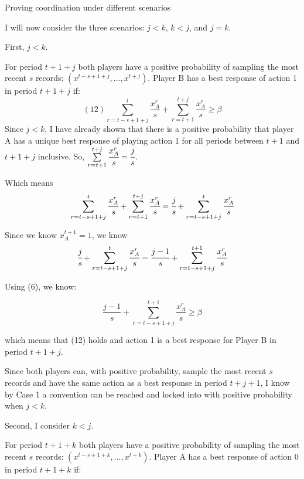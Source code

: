 \documentclass{article}
\begin{document}
\vskip12pt

\centering

Proving coordination under different scenarios

\vskip6pt

\raggedright

I will now consider the three scenarios: $j<k$, $k<j$, and $j=k$.

\vskip12pt

First, $j<k$. 

\vskip6pt

For period $t+1+j$ both players have a positive probability of sampling the most recent $s$ records: $(x^{t-s+1+j},...,x^{t+j})$. Player B has a best response of action 1 in period $t+1+j$ if:
$$(12) \sum\limits_{r=t-s+1+j}^{t}\frac{x^r_A}{s}+\sum\limits_{r=t+1}^{t+j} \frac{x^r_A}{s} \geq \beta$$
Since $j<k$, I have already shown that there is a positive probability that player A has a unique best response of playing action 1 for all periods between $t+1$ and $t+1+j$ inclusive. So, $\sum\limits_{r=t+1}^{t+j} \cfrac{x^r_A}{s}=\cfrac{j}{s}$.

Which means 
$$\sum\limits_{r=t-s+1+j}^{t}\cfrac{x^r_A}{s}+\sum\limits_{r=t+1}^{t+j} \cfrac{x^r_A}{s}=\cfrac{j}{s}+\sum\limits_{r=t-s+1+j}^{t}\cfrac{x^r_A}{s}$$

Since we know $x^{t+1}_A = 1$, we know $$\cfrac{j}{s}+\sum\limits_{r=t-s+1+j}^{t}\cfrac{x^r_A}{s} = \cfrac{j-1}{s}+\sum\limits_{r=t-s+1+j}^{t+1}\cfrac{x^r_A}{s}$$

Using (6), we know:

$$\frac{j-1}{s}+\sum\limits_{r=t-s+1+j}^{t+1} \frac{x^r_A}{s} \geq \beta$$

which means that (12) holds and action 1 is a best response for Player B in period $t+1+j$.

\vskip6pt

Since both players can, with positive probability, sample the most recent $s$ records and have the same action as a best response in period $t+j+1$, I know by Case 1 a convention can be reached and locked into with positive probability when $j<k$.

\vskip18pt

Second, I consider $k<j$.

\vskip6pt

For period $t+1+k$ both players have a positive probability of sampling the most recent $s$ records: $(x^{t-s+1+k},...,x^{t+k})$. Player A has a best response of action 0 in period $t+1+k$ if:
\end{document}
